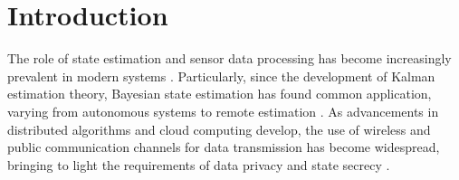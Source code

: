 \documentclass[letterpaper, 10 pt, conference]{ieeeconf}
\begin{document}

% 
%                                                        
%                                                        
%                                                        
% 

\section{Introduction}
The role of state estimation and sensor data processing has become increasingly prevalent in modern systems \cite{ligginsDistributedDataFusion2012}. Particularly, since the development of Kalman estimation theory, Bayesian state estimation has found common application, varying from autonomous systems to remote estimation \cite{mutambaraDecentralizedEstimationControl1998,sinopoliKalmanFilteringIntermittent2004}. As advancements in distributed algorithms and cloud computing develop, the use of wireless and public communication channels for data transmission has become widespread, bringing to light the requirements of data privacy and state secrecy \cite{renSecurityChallengesPublic2012,brennerSecretProgramExecution2011}.
\end{document}
